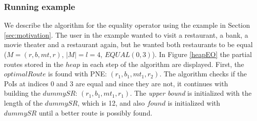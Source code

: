\subsubsection{Running example}
We describe the algorithm for the equality operator using the example in Section \ref{sec:motivation}. The user in the example wanted to visit a restaurant, a bank, a movie theater and a restaurant again, but he wanted both restaurants to be equal ($M = (r, b, mt, r)$, $|M| = l = 4$, $EQUAL(0, 3)$). In Figure \ref{heapEO} the partial routes stored in the $heap$ in each step of the algorithm are displayed.
First, the $optimalRoute$ is found with PNE: $(r_1, b_1, mt_1, r_2)$. The algorithm checks if the PoIs at indices 0 and 3 are equal and since they are not, it continues with building the $dummySR$: $(r_1, b_1, mt_1, r_1)$. The \textit{upper bound} is initialized with the length of the $dummySR$, which is 12, and also $found$ is initialized with $dummySR$ until a better route is possibly found.
